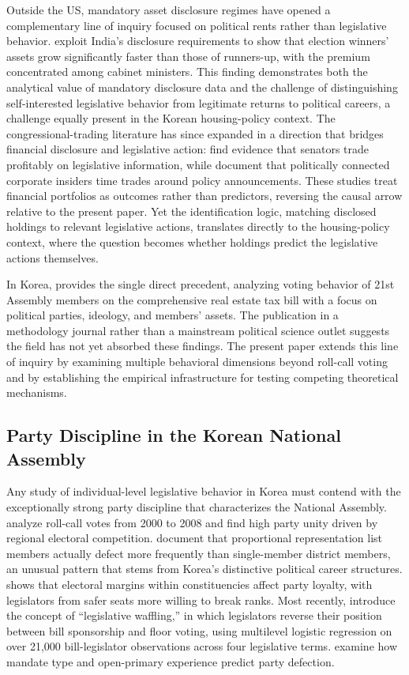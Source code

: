 \documentclass[11pt]{article}
\begin{document}
Outside the US, mandatory asset disclosure regimes have opened a complementary line of inquiry focused on political rents rather than legislative behavior. \citet{fisman2014} exploit India's disclosure requirements to show that election winners' assets grow significantly faster than those of runners-up, with the premium concentrated among cabinet ministers. This finding demonstrates both the analytical value of mandatory disclosure data and the challenge of distinguishing self-interested legislative behavior from legitimate returns to political careers, a challenge equally present in the Korean housing-policy context. The congressional-trading literature has since expanded in a direction that bridges financial disclosure and legislative action: \citet{li2025} find evidence that senators trade profitably on legislative information, while \citet{jagolinzer2020} document that politically connected corporate insiders time trades around policy announcements. These studies treat financial portfolios as outcomes rather than predictors, reversing the causal arrow relative to the present paper. Yet the identification logic, matching disclosed holdings to relevant legislative actions, translates directly to the housing-policy context, where the question becomes whether holdings predict the legislative actions themselves.

In Korea, \citet{seo2025} provides the single direct precedent, analyzing voting behavior of 21st Assembly members on the comprehensive real estate tax bill with a focus on political parties, ideology, and members' assets. The publication in a methodology journal rather than a mainstream political science outlet suggests the field has not yet absorbed these findings. The present paper extends this line of inquiry by examining multiple behavioral dimensions beyond roll-call voting and by establishing the empirical infrastructure for testing competing theoretical mechanisms.

\subsection{Party Discipline in the Korean National Assembly}

Any study of individual-level legislative behavior in Korea must contend with the exceptionally strong party discipline that characterizes the National Assembly. \citet{shinLee2015} analyze roll-call votes from 2000 to 2008 and find high party unity driven by regional electoral competition. \citet{junHix2010} document that proportional representation list members actually defect more frequently than single-member district members, an unusual pattern that stems from Korea's distinctive political career structures. \citet{jung2022} shows that electoral margins within constituencies affect party loyalty, with legislators from safer seats more willing to break ranks. Most recently, \citet{kangPark2025} introduce the concept of ``legislative waffling,'' in which legislators reverse their position between bill sponsorship and floor voting, using multilevel logistic regression on over 21,000 bill-legislator observations across four legislative terms. \citet{kimPark2022} examine how mandate type and open-primary experience predict party defection.
\end{document}
